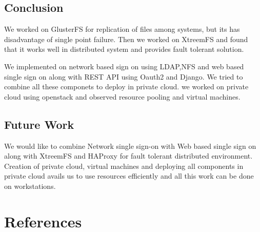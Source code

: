 \documentclass[12pt]{report}
\begin{document}
\section{Conclusion} 

\hspace{0.5cm} We worked on GlusterFS for replication of files among systems, but its has disadvantage of single point failure. Then we worked on XtreemFS and found that it works well in distributed system and provides fault tolerant solution. \newline

We implemented on network based sign on using LDAP,NFS and web based single sign on along with REST API using Oauth2 and Django. We tried to combine all these componets to deploy in private cloud. we worked on private cloud using openstack and observed resource pooling and virtual machines.\newline

\section{Future Work}
\hspace{0.5cm} We would like to combine Network single sign-on with Web based single sign on along with XtreemFS and HAProxy for fault tolerant distributed environment. Creation of private cloud, virtual machines and deploying all components in private cloud avails us to use resources efficiently and all this work can be done on workstations.


\chapter*{References}

\end{document}
